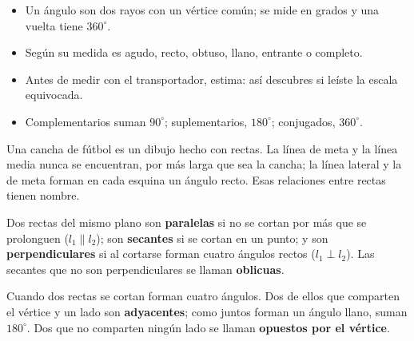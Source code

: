 \documentclass[11pt]{article}
\begin{document}
\begin{resumen}
\begin{itemize}
  \item Un ángulo son dos rayos con un vértice común; se mide en grados y una vuelta tiene $360^\circ$.
  \item Según su medida es agudo, recto, obtuso, llano, entrante o completo.
  \item Antes de medir con el transportador, estima: así descubres si leíste la escala equivocada.
  \item Complementarios suman $90^\circ$; suplementarios, $180^\circ$; conjugados, $360^\circ$.
\end{itemize}
\end{resumen}

\label{tema:angulosrectas}

\begin{hilo}
Una cancha de fútbol es un dibujo hecho con rectas. La línea de meta y la línea media nunca se
encuentran, por más larga que sea la cancha; la línea lateral y la de meta forman en cada
esquina un ángulo recto. Esas relaciones entre rectas tienen nombre.
\end{hilo}

\begin{definicion}
Dos rectas del mismo plano son \textbf{paralelas} si no se cortan por más que se prolonguen
($l_1 \parallel l_2$); son \textbf{secantes} si se cortan en un punto; y son
\textbf{perpendiculares} si al cortarse forman cuatro ángulos rectos ($l_1 \perp l_2$). Las
secantes que no son perpendiculares se llaman \textbf{oblicuas}.
\end{definicion}

Cuando dos rectas se cortan forman cuatro ángulos. Dos de ellos que comparten el vértice y un
lado son \textbf{adyacentes}; como juntos forman un ángulo llano, suman $180^\circ$. Dos que no
comparten ningún lado se llaman \textbf{opuestos por el vértice}.

\begin{center}
\end{center}
\end{document}
